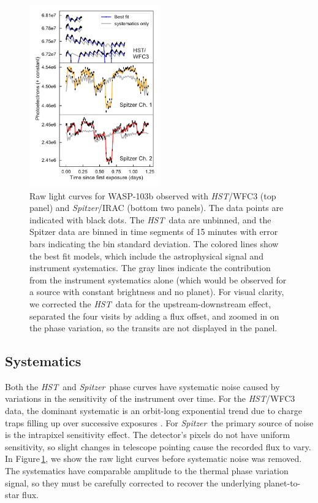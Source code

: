 \documentclass[twocolumn]{aastex61}
\newcommand{\project}[1]{\textsl{#1}}
\newcommand{\HST}{\project{HST}}
\newcommand{\Spitzer}{\project{Spitzer}}
\begin{document}
\begin{figure}
\includegraphics[width = 0.5\textwidth]{Figures/systematics.pdf}
\caption{Raw light curves for WASP-103b observed with \HST/WFC3 (top panel) and \Spitzer/IRAC (bottom two panels). The data points are indicated with black dots. The \HST\ data are unbinned, and the Spitzer data are binned in time segments of 15 minutes with error bars indicating the bin standard deviation. The colored lines show the best fit models, which include the astrophysical signal and instrument systematics. The gray lines indicate the contribution from the instrument systematics alone (which would be observed for a source with constant brightness and no planet). For visual clarity, we corrected the \HST\ data for the upstream-downstream effect, separated the four visits by adding a flux offset, and zoomed in on the phase variation, so the transits are not displayed in the panel.}
\label{fig:systematics}
\end{figure}


\subsection{Systematics}
Both the \HST\ and \Spitzer\ phase curves have systematic noise caused by variations in the sensitivity of the instrument over time. For the \HST/WFC3 data, the dominant systematic is an orbit-long exponential trend due to charge traps filling up over successive exposures \citep{long15, zhu17}. For \Spitzer\, the primary source of noise is the intrapixel sensitivity effect. The detector's pixels do not have uniform sensitivity, so slight changes in telescope pointing cause the recorded flux to vary. In Figure\,\ref{fig:systematics}, we show the raw light curves before systematic noise was removed. The systematics have comparable amplitude to the thermal phase variation signal, so they must be carefully corrected to recover the underlying planet-to-star flux. 
\end{document}
